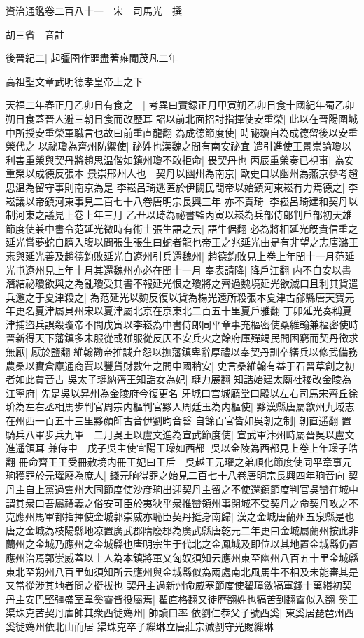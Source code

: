 資治通鑑卷二百八十一　宋　司馬光　撰

胡三省　音註

後晉紀二|{
	起彊圉作噩盡著雍閹茂凡二年}


高祖聖文章武明德孝皇帝上之下

天福二年春正月乙卯日有食之　|{
	考異曰實録正月甲寅朔乙卯日食十國紀年蜀乙卯朔日食蓋晉人避三朝日食而改歷耳}
詔以前北面招討指揮使安重榮|{
	此以在晉陽圍城中所授安重榮軍職言也故曰前重直龍翻}
為成德節度使|{
	時祕瓊自為成德留後以安重榮代之}
以祕瓊為齊州防禦使|{
	祕姓也漢魏之間有南安祕宜}
遣引進使王景崇諭瓊以利害重榮與契丹將趙思温偕如鎮州瓊不敢拒命|{
	畏契丹也}
丙辰重榮奏已視事|{
	為安重榮以成德反張本}
景崇邢州人也　契丹以幽州為南京|{
	歐史曰以幽州為燕京參考趙思温為留守事則南京為是}
李崧呂琦逃匿於伊闕民間帝以始鎮河東崧有力焉德之|{
	李崧議以帝鎮河東事見二百七十八卷唐明宗長興三年}
亦不責琦|{
	李崧呂琦建和契丹以制河東之議見上卷上年三月}
乙丑以琦為祕書監丙寅以崧為兵部侍郎判戶部初天雄節度使兼中書令范延光微時有術士張生語之云|{
	語牛倨翻}
必為將相延光旣貴信重之延光嘗夢蛇自臍入腹以問張生張生曰蛇者龍也帝王之兆延光由是有非望之志唐潞王素與延光善及趙德鈞敗延光自遼州引兵還魏州|{
	趙德鈞敗見上卷上年閏十一月范延光屯遼州見上年十月其還魏州亦必在閏十一月}
奉表請降|{
	降戶江翻}
内不自安以書濳結祕瓊欲與之為亂瓊受其書不報延光恨之瓊將之齊過魏境延光欲滅口且利其貨遣兵邀之于夏津殺之|{
	為范延光以魏反復以貨為楊光遠所殺張本夏津古鄃縣唐天寶元年更名夏津屬貝州宋以夏津屬北京在京東北二百五十里夏戶雅翻}
丁卯延光奏稱夏津捕盜兵誤殺瓊帝不問戊寅以李崧為中書侍郎同平章事充樞密使桑維翰兼樞密使時晉新得天下藩鎮多未服從或雖服從反仄不安兵火之餘府庫殫竭民間困窮而契丹徵求無厭|{
	厭於鹽翻}
維翰勸帝推誠弃怨以撫藩鎮卑辭厚禮以奉契丹訓卒繕兵以修武備務農桑以實倉廪通商賈以豐貨財數年之間中國稍安|{
	史言桑維翰有益于石晉草創之初者如此賈音古}
吳太子璉納齊王知誥女為妃|{
	璉力展翻}
知誥始建太廟社稷改金陵為江寧府|{
	先是吳以昇州為金陵府今復更名}
牙城曰宫城廳堂曰殿以左右司馬宋齊丘徐玠為左右丞相馬步判官周宗内樞判官黟人周廷玉為内樞使|{
	黟漢縣唐屬歙州九域志在州西一百五十三里黟顔師古音伊劉昫音䃜}
自餘百官皆如吳朝之制|{
	朝直遥翻}
置騎兵八軍步兵九軍　二月吳王以盧文進為宣武節度使|{
	宣武軍汴州時屬晉吳以盧文進遥領耳}
兼侍中　戊子吳主使宜陽王璪如西都|{
	吳以金陵為西都見上卷上年璪子皓翻}
冊命齊王王受冊赦境内冊王妃曰王后　吳越王元瓘之弟順化節度使同平章事元珦獲罪於元瓘廢為庶人|{
	錢元晌得罪之始見二百七十八卷唐明宗長興四年珦音向}
契丹主自上黨過雲州大同節度使沙彦珦出迎契丹主留之不使還鎮節度判官吳巒在城中謂其衆曰吾屬禮義之俗安可臣於夷狄乎衆推巒領州事閉城不受契丹之命契丹攻之不克應州馬軍都指揮使金城郭崇威亦恥臣契丹挺身南歸|{
	漢之金城唐蘭州五泉縣是也唐之金城為枝陽縣地凉置廣武郡隋廢郡為廣武縣唐乾元二年更曰金城屬蘭州按此非蘭州之金城乃應州之金城縣也唐明宗生于代北之金鳳城及即位以其地置金城縣仍置應州治焉郭崇威蓋以土人為本鎮將軍又匈奴須知云應州東至幽州八百五十里金城縣東北至朔州八百里如須知所云應州與金城縣似為兩處南北風馬牛不相及未能審其是又當從涉其地者問之挺拔也}
契丹主過新州命威塞節度使翟璋斂犒軍錢十萬緡初契丹主安巴堅彊盛室韋奚霫皆役屬焉|{
	翟直格翻又徒歷翻姓也犒苦到翻霫似入翻}
奚王渠珠克苦契丹虐帥其衆西徙媯州|{
	帥讀曰率}
依劉仁恭父子號西奚|{
	東奚居琵琶州西奚徙媯州依北山而居}
渠珠克卒子繅琳立唐莊宗滅劉守光賜繅琳

